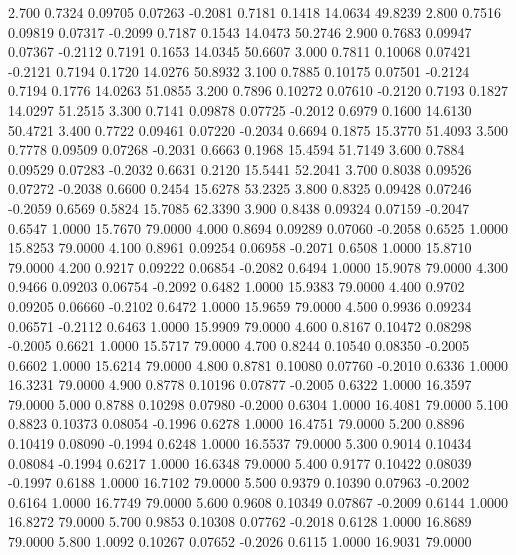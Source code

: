    2.700   0.7324   0.09705   0.07263  -0.2081   0.7181   0.1418  14.0634  49.8239
   2.800   0.7516   0.09819   0.07317  -0.2099   0.7187   0.1543  14.0473  50.2746
   2.900   0.7683   0.09947   0.07367  -0.2112   0.7191   0.1653  14.0345  50.6607
   3.000   0.7811   0.10068   0.07421  -0.2121   0.7194   0.1720  14.0276  50.8932
   3.100   0.7885   0.10175   0.07501  -0.2124   0.7194   0.1776  14.0263  51.0855
   3.200   0.7896   0.10272   0.07610  -0.2120   0.7193   0.1827  14.0297  51.2515
   3.300   0.7141   0.09878   0.07725  -0.2012   0.6979   0.1600  14.6130  50.4721
   3.400   0.7722   0.09461   0.07220  -0.2034   0.6694   0.1875  15.3770  51.4093
   3.500   0.7778   0.09509   0.07268  -0.2031   0.6663   0.1968  15.4594  51.7149
   3.600   0.7884   0.09529   0.07283  -0.2032   0.6631   0.2120  15.5441  52.2041
   3.700   0.8038   0.09526   0.07272  -0.2038   0.6600   0.2454  15.6278  53.2325
   3.800   0.8325   0.09428   0.07246  -0.2059   0.6569   0.5824  15.7085  62.3390
   3.900   0.8438   0.09324   0.07159  -0.2047   0.6547   1.0000  15.7670  79.0000
   4.000   0.8694   0.09289   0.07060  -0.2058   0.6525   1.0000  15.8253  79.0000
   4.100   0.8961   0.09254   0.06958  -0.2071   0.6508   1.0000  15.8710  79.0000
   4.200   0.9217   0.09222   0.06854  -0.2082   0.6494   1.0000  15.9078  79.0000
   4.300   0.9466   0.09203   0.06754  -0.2092   0.6482   1.0000  15.9383  79.0000
   4.400   0.9702   0.09205   0.06660  -0.2102   0.6472   1.0000  15.9659  79.0000
   4.500   0.9936   0.09234   0.06571  -0.2112   0.6463   1.0000  15.9909  79.0000
   4.600   0.8167   0.10472   0.08298  -0.2005   0.6621   1.0000  15.5717  79.0000
   4.700   0.8244   0.10540   0.08350  -0.2005   0.6602   1.0000  15.6214  79.0000
   4.800   0.8781   0.10080   0.07760  -0.2010   0.6336   1.0000  16.3231  79.0000
   4.900   0.8778   0.10196   0.07877  -0.2005   0.6322   1.0000  16.3597  79.0000
   5.000   0.8788   0.10298   0.07980  -0.2000   0.6304   1.0000  16.4081  79.0000
   5.100   0.8823   0.10373   0.08054  -0.1996   0.6278   1.0000  16.4751  79.0000
   5.200   0.8896   0.10419   0.08090  -0.1994   0.6248   1.0000  16.5537  79.0000
   5.300   0.9014   0.10434   0.08084  -0.1994   0.6217   1.0000  16.6348  79.0000
   5.400   0.9177   0.10422   0.08039  -0.1997   0.6188   1.0000  16.7102  79.0000
   5.500   0.9379   0.10390   0.07963  -0.2002   0.6164   1.0000  16.7749  79.0000
   5.600   0.9608   0.10349   0.07867  -0.2009   0.6144   1.0000  16.8272  79.0000
   5.700   0.9853   0.10308   0.07762  -0.2018   0.6128   1.0000  16.8689  79.0000
   5.800   1.0092   0.10267   0.07652  -0.2026   0.6115   1.0000  16.9031  79.0000
